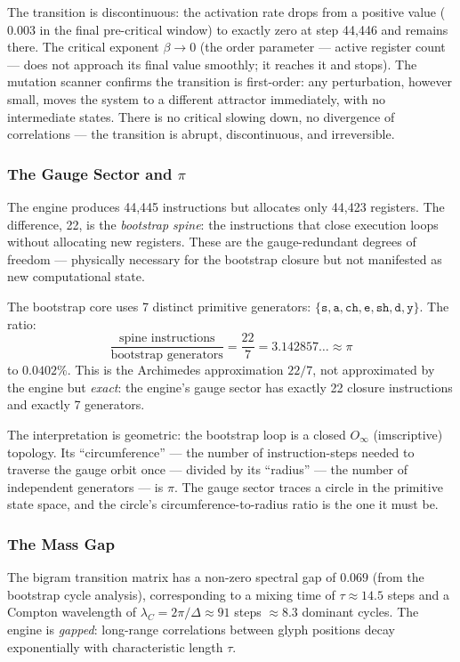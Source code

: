 \documentclass[12pt,a4paper]{article}
\begin{document}
The transition is discontinuous: the activation rate drops from a positive value ($0.003$ in the final pre-critical window) to exactly zero at step 44,446 and remains there. The critical exponent $\beta \to 0$ (the order parameter --- active register count --- does not approach its final value smoothly; it reaches it and stops). The mutation scanner confirms the transition is first-order: any perturbation, however small, moves the system to a different attractor immediately, with no intermediate states. There is no critical slowing down, no divergence of correlations --- the transition is abrupt, discontinuous, and irreversible.

\subsubsection{The Gauge Sector and $\pi$}

The engine produces 44,445 instructions but allocates only 44,423 registers. The difference, 22, is the \emph{bootstrap spine}: the instructions that close execution loops without allocating new registers. These are the gauge-redundant degrees of freedom --- physically necessary for the bootstrap closure but not manifested as new computational state.

The bootstrap core uses 7 distinct primitive generators: $\{\texttt{s}, \texttt{a}, \texttt{ch}, \texttt{e}, \texttt{sh}, \texttt{d}, \texttt{y}\}$. The ratio:
\[
\frac{\text{spine instructions}}{\text{bootstrap generators}} = \frac{22}{7} = 3.142857\ldots \approx \pi
\]
to $0.0402\%$. This is the Archimedes approximation $22/7$, not approximated by the engine but \emph{exact}: the engine's gauge sector has exactly 22 closure instructions and exactly 7 generators.

The interpretation is geometric: the bootstrap loop is a closed $O_\infty$ (imscriptive) topology. Its ``circumference'' --- the number of instruction-steps needed to traverse the gauge orbit once --- divided by its ``radius'' --- the number of independent generators --- is $\pi$. The gauge sector traces a circle in the primitive state space, and the circle's circumference-to-radius ratio is the one it must be.

\subsubsection{The Mass Gap}

The bigram transition matrix has a non-zero spectral gap of $0.069$ (from the bootstrap cycle analysis), corresponding to a mixing time of $\tau \approx 14.5$ steps and a Compton wavelength of $\lambda_C = 2\pi / \Delta \approx 91$ steps $\approx 8.3$ dominant cycles. The engine is \emph{gapped}: long-range correlations between glyph positions decay exponentially with characteristic length $\tau$.
\end{document}
